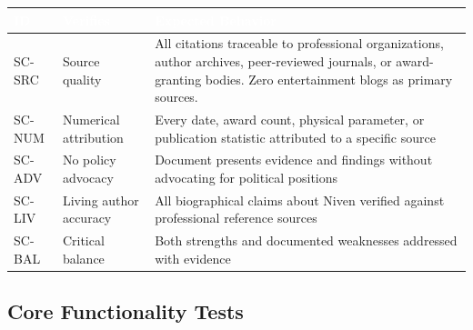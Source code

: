 \documentclass[11pt,letterpaper]{article}
\newcommand{\tableheader}[1]{\textbf{\sffamily\textcolor{white}{#1}}}
\begin{document}
\begin{center}
\begin{tabularx}{\textwidth}{C{1.2cm}L{3.5cm}X}
\toprule
{}
\tableheader{ID} & \tableheader{Verifies} & \tableheader{Expected Behavior} \\
\midrule
SC-SRC & Source quality & All citations traceable to professional organizations, author archives, peer-reviewed journals, or award-granting bodies. Zero entertainment blogs as primary sources. \\
SC-NUM & Numerical attribution & Every date, award count, physical parameter, or publication statistic attributed to a specific source \\
SC-ADV & No policy advocacy & Document presents evidence and findings without advocating for political positions \\
SC-LIV & Living author accuracy & All biographical claims about Niven verified against professional reference sources \\
SC-BAL & Critical balance & Both strengths and documented weaknesses addressed with evidence \\
\bottomrule
\end{tabularx}
\end{center}

\subsection{Core Functionality Tests}
\end{document}
